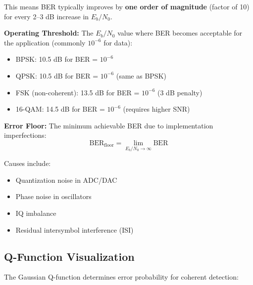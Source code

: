 This means BER typically improves by \textbf{one order of magnitude} (factor of 10) for every 2--3 dB increase in $E_b/N_0$.

\textbf{Operating Threshold:}
The $E_b/N_0$ value where BER becomes acceptable for the application (commonly $10^{-6}$ for data):
\begin{itemize}
\item BPSK: 10.5 dB for BER = $10^{-6}$
\item QPSK: 10.5 dB for BER = $10^{-6}$ (same as BPSK)
\item FSK (non-coherent): 13.5 dB for BER = $10^{-6}$ (3 dB penalty)
\item 16-QAM: 14.5 dB for BER = $10^{-6}$ (requires higher SNR)
\end{itemize}

\textbf{Error Floor:}
The minimum achievable BER due to implementation imperfections:
\begin{equation}
\mathrm{BER}_{\mathrm{floor}} = \lim_{E_b/N_0 \to \infty} \mathrm{BER}
\label{eq:ber-floor}
\end{equation}

Causes include:
\begin{itemize}
\item Quantization noise in ADC/DAC
\item Phase noise in oscillators
\item IQ imbalance
\item Residual intersymbol interference (ISI)
\end{itemize}

\subsection{Q-Function Visualization}

The Gaussian Q-function determines error probability for coherent detection:

\begin{center}
\end{center}

